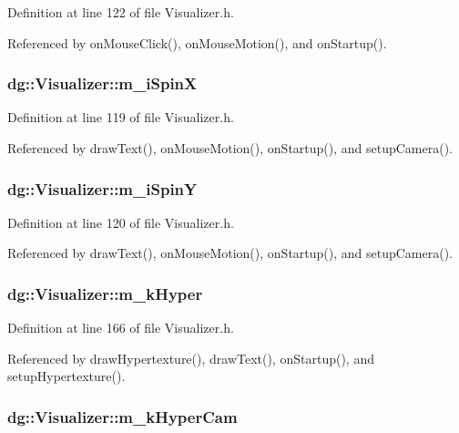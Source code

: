 Definition at line 122 of file Visualizer.h.

Referenced by on\-Mouse\-Click(), on\-Mouse\-Motion(), and on\-Startup().
\subsubsection{ dg::Visualizer::m\_\-i\-Spin\-X\hspace{0.3cm}{\tt  [protected]}}\label{classdg_1_1Visualizer_n19}




Definition at line 119 of file Visualizer.h.

Referenced by draw\-Text(), on\-Mouse\-Motion(), on\-Startup(), and setup\-Camera().
\subsubsection{ dg::Visualizer::m\_\-i\-Spin\-Y\hspace{0.3cm}{\tt  [protected]}}\label{classdg_1_1Visualizer_n20}




Definition at line 120 of file Visualizer.h.

Referenced by draw\-Text(), on\-Mouse\-Motion(), on\-Startup(), and setup\-Camera().
\subsubsection{ dg::Visualizer::m\_\-k\-Hyper\hspace{0.3cm}{\tt  [protected]}}\label{classdg_1_1Visualizer_n48}




Definition at line 166 of file Visualizer.h.

Referenced by draw\-Hypertexture(), draw\-Text(), on\-Startup(), and setup\-Hypertexture().
\subsubsection{ dg::Visualizer::m\_\-k\-Hyper\-Cam\hspace{0.3cm}{\tt  [protected]}}\label{classdg_1_1Visualizer_n49}




